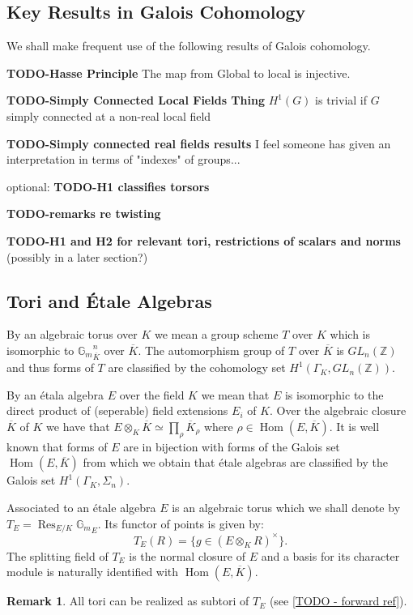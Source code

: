 \documentclass{article}
\theoremstyle{plain}
\theoremstyle{definition}
\newtheorem{remark}[theorem]{Remark}
\numberwithin{equation}{section}
\DeclareMathOperator{\Hom}{Hom}
\DeclareMathOperator{\Res}{Res}
\newcommand{\ZZ}{\mathbb{Z}}
\newcommand{\Gm}{\mathbb{G}_m}
\newcommand{\GalKbK}{\Gamma_K}
\newcommand{\TODO}[1]{\textbf{TODO-#1}}
\begin{document}
\subsection{Key Results in Galois Cohomology}

We shall make frequent use of the following results of Galois cohomology.

\TODO{Hasse Principle} The map from Global to local is injective.

\TODO{Simply Connected Local Fields Thing} $H^1(G)$ is trivial if $G$ simply connected at a non-real local field

\TODO{Simply connected real fields results} I feel someone has given an interpretation in terms of "indexes" of groups...

optional:
\TODO{H1 classifies torsors}

\TODO{remarks re twisting}

\TODO{H1 and H2 for relevant tori, restrictions of scalars and norms} (possibly in a later section?)


\subsection{Tori and \'Etale Algebras}

By an algebraic torus over $K$ we mean a group scheme $T$ over $K$ which is isomorphic to ${\Gm}_{\overline{K}}^n$ over $\overline{K}$.
The automorphism group of $T$ over $\overline{K}$ is $GL_n(\ZZ)$ and thus forms of $T$ are classified by the cohomology set $H^1(\GalKbK,GL_n(\ZZ))$.

By an \'etala algebra $E$ over the field $K$ we mean that $E$ is isomorphic to the direct product of (seperable) field extensions $E_i$ of $K$.
Over the algebraic closure $\overline{K}$ of $K$ we have that $E\otimes_K \overline{K} \simeq \prod_\rho \overline{K}_\rho$ where $\rho \in \Hom(E,\overline{K})$.
It is well known that forms of $E$ are in bijection with forms of the Galois set $\Hom(E,\overline{K})$ from which we obtain that \'etale algebras are classified by the Galois set $H^1(\GalKbK, \Sigma_n)$.

Associated to an \'etale algebra $E$ is an algebraic torus which we shall denote by $T_E = \Res_{E/K} {\Gm}_E$.
Its functor of points is given by:
\[ T_E(R) = \{ g \in (E\otimes_K R)^\times \}. \]
The splitting field of $T_E$ is the normal closure of $E$ and a basis for its character module is naturally identified with $\Hom(E,\overline{K})$.

\begin{remark}
All tori can be realized as subtori of $T_E$ (see \ref{TODO - forward ref}).
\end{remark}
\end{document}
